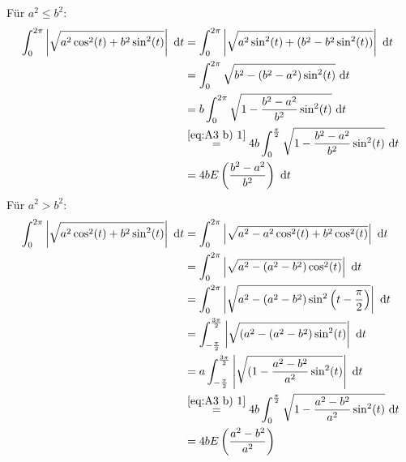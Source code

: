 \documentclass[sectionformat=aufgabe]{gadsescript}
\begin{document}
\begin{enumerate}[label=(\alph*)]
		Für $ a^2 \leq b^2 $:
		\begin{align*}
			\int_{0}^{2 \pi } \left| \sqrt{a^2 \cos ^2 (t) + b^2 \sin ^2 (t)}  \right| ~\text{d} t &= \int_{0}^{2 \pi } \left| \sqrt{ a^2 \sin ^2 (t) + (b^2 - b^2 \sin ^2 (t) ) }  \right| ~\text{d} t \\
			&= \int_{0}^{2 \pi } \sqrt{b^2 - (b^2 - a^2) \sin ^2 (t)} ~\text{d} t \\
			&= b \int_{0}^{2 \pi } \sqrt{1 - \frac{b^2 - a^2}{ b^2 }  \sin ^2 (t)} ~\text{d} t \\
			&\overset{\eqref{eq:A3 b) 1}}{=} 4 b \int_{0}^{\frac{ \pi }{ 2 }  } \sqrt{1 - \frac{b^2 - a^2}{ b^2 }  \sin ^2 (t)} ~\text{d} t \\
			&= 4 b E \left( \frac{ b^2 - a^2 }{ b^2 }  \right)  ~\text{d} t \\
		\end{align*}
		Für $ a^2 > b^2 $:
		\begin{align*}
			\int_{0}^{2 \pi } \left| \sqrt{a^2 \cos ^2 (t) + b^2 \sin ^2 (t)}  \right| ~\text{d} t
			&= \int_{0}^{2 \pi } \left| \sqrt{ a^2 - a^2 \cos ^2 (t) + b^2 \cos ^2 (t) }  \right| ~\text{d} t \\
			&= \int_{0}^{2 \pi } \left| \sqrt{ a^2 - (a^2 - b^2) \cos ^2 (t) }  \right| ~\text{d} t \\
			&= \int_{0}^{2 \pi } \left| \sqrt{ a^2 - (a^2 - b^2) \sin ^2 \left(t - \frac{ \pi }{ 2 } \right) }  \right| ~\text{d} t \\
			&= \int_{-\frac{ \pi }{ 2 } }^{\frac{3 \pi }{ 2 }  } \left| \sqrt{ (a^2 - (a^2 - b^2) \sin ^2 (t) }  \right| ~\text{d} t \\
			&= a \int_{-\frac{ \pi }{ 2 } }^{\frac{3 \pi }{ 2 } } \left| \sqrt{ (1 - \frac{a^2 - b^2}{ a^2 }  \sin ^2 (t) }  \right| ~\text{d} t \\
			&\overset{\eqref{eq:A3 b) 1}}{=} 4 b \int_{0}^{\frac{ \pi }{ 2 }  } \sqrt{1 - \frac{a^2 - b^2}{ a^2 }  \sin ^2 (t)} ~\text{d} t \\
			&= 4 b E \left( \frac{ a^2 - b^2 }{ a^2 }  \right) \\
		\end{align*}
		
\end{enumerate}
\end{document}
